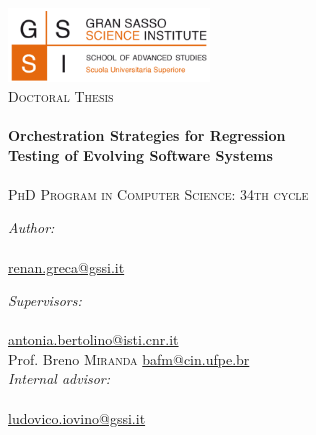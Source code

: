 \documentclass[11pt, a4paper, oneside]{Thesis} %
\begin{document}
\begin{titlepage}
\begin{center}

\includegraphics[width=0.4\textwidth]{./figures/logo_GSSI}~\\[1cm]
\textsc{\Large Doctoral Thesis}\\[0.5cm] %

\HRule \\[0.1cm] %
{\huge \bfseries  Orchestration Strategies for Regression\\[0.3cm] Testing of Evolving Software Systems }\\[0.3cm] %
\HRule \\[0.9cm] %

{\Large \textsc{PhD Program in Computer Science: 34th cycle}}\\[2cm]

\begin{minipage}{0.4\textwidth}
\begin{flushleft} \large
\emph{Author:}\\
\bigskip \authornames \\
\href{mailto:renan.greca@gssi.it}{renan.greca@gssi.it}
\end{flushleft}
\end{minipage}
\begin{minipage}{0.5\textwidth}
\begin{flushright} \large
\emph{Supervisors:} \\
\bigskip \supname \\
\href{mailto:antonia.bertolino@isti.cnr.it}{antonia.bertolino@isti.cnr.it} \\
Prof. Breno \textsc{Miranda}
\href{mailto:bafm@cin.ufpe.br}{bafm@cin.ufpe.br} \\
\bigskip \bigskip
\emph{Internal advisor:} \\
\bigskip \examname \\
\href{mailto:ludovico.iovino@gssi.it}{ludovico.iovino@gssi.it}
\end{flushright}
\end{minipage}\\[2.0cm]
 

\end{center}
\end{titlepage}
\end{document}
